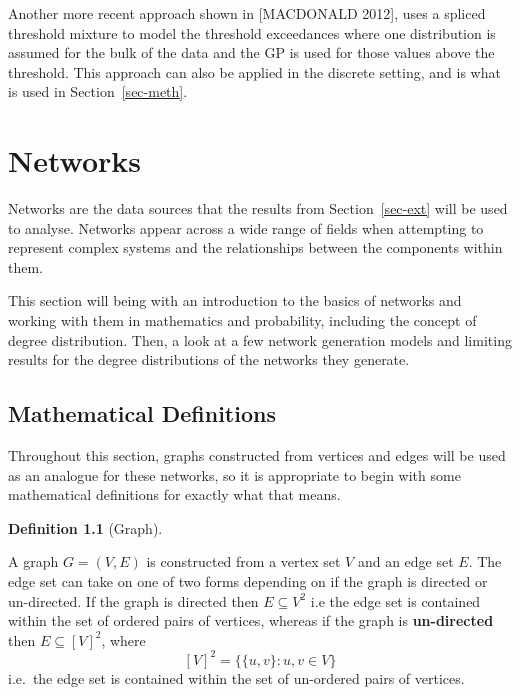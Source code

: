 \documentclass[
  10pt,
  a4paper,
]{scrreprt}
\theoremstyle{plain}
\theoremstyle{definition}
\newtheorem{definition}{Definition}[section]
\theoremstyle{remark}
\begin{document}
{Another more recent approach shown in {[}MACDONALD 2012{]}, uses a
spliced threshold mixture to model the threshold exceedances where one
distribution is assumed for the bulk of the data and the GP is used for
those values above the threshold. This approach can also be applied in
the discrete setting, and is what is used in Section~\ref{sec-meth}.

\hypertarget{sec-net}{%
\chapter{Networks}\label{sec-net}}

Networks are the data sources that the results from
Section~\ref{sec-ext} will be used to analyse. Networks appear across a
wide range of fields when attempting to represent complex systems and
the relationships between the components within them.

This section will being with an introduction to the basics of networks
and working with them in mathematics and probability, including the
concept of degree distribution. Then, a look at a few network generation
models and limiting results for the degree distributions of the networks
they generate.

\hypertarget{mathematical-definitions}{%
\section{Mathematical Definitions}\label{mathematical-definitions}}

Throughout this section, graphs constructed from vertices and edges will
be used as an analogue for these networks, so it is appropriate to begin
with some mathematical definitions for exactly what that means.

\begin{definition}[Graph]\protect\hypertarget{def-net}{}\label{def-net}

A graph \(G = (V,E)\) is constructed from a vertex set \(V\) and an edge
set \(E\). The edge set can take on one of two forms depending on if the
graph is directed or un-directed. If the graph is directed then
\(E\subseteq V^2\) i.e the edge set is contained within the set of
ordered pairs of vertices, whereas if the graph is \textbf{un-directed}
then \(E\subseteq [V]^2\), where \[
[V]^2 = \{\{u,v\}:u,v\in V\}
\] i.e.~the edge set is contained within the set of un-ordered pairs of
vertices.

\end{definition}

}
\end{document}
